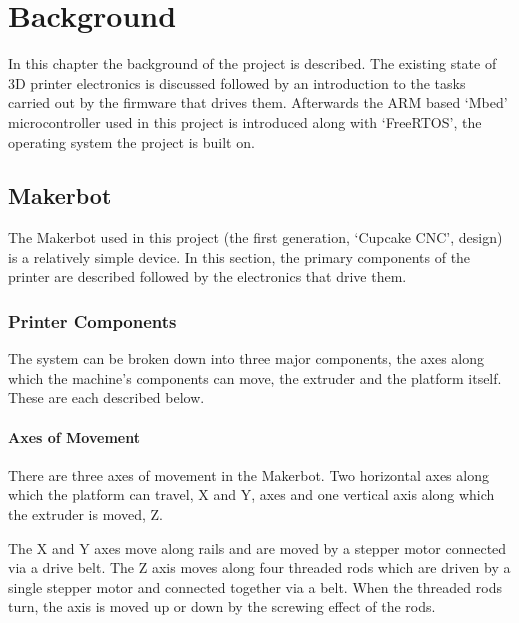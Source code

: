 \chapter{Background}
	
	
	\label{sec:background}
	
	In this chapter the background of the project is described. The existing state
	of 3D printer electronics is discussed followed by an introduction to the
	tasks carried out by the firmware that drives them. Afterwards the ARM based
	`Mbed' microcontroller used in this project is introduced along with
	`FreeRTOS', the operating system the project is built on.
	
	\section{Makerbot}
		
		The Makerbot used in this project (the first generation, `Cupcake CNC',
		design) is a relatively simple device. In this section, the primary
		components of the printer are described followed by the electronics that
		drive them.
		
		\subsection{Printer Components}
			
			The system can be broken down into three major components, the axes along
			which the machine's components can move, the extruder and the platform
			itself. These are each described below.
			
			\subsubsection{Axes of Movement}
				
				
				There are three axes of movement in the Makerbot. Two horizontal axes
				along which the platform can travel, X and Y, axes and one vertical axis
				along which the extruder is moved, Z.
				
				The X and Y axes move along rails and are moved by a stepper motor
				connected via a drive belt. The Z axis moves along four threaded rods
				which are driven by a single stepper motor and connected together via a
				belt. When the threaded rods turn, the axis is moved up or down by the
				screwing effect of the rods.
				
